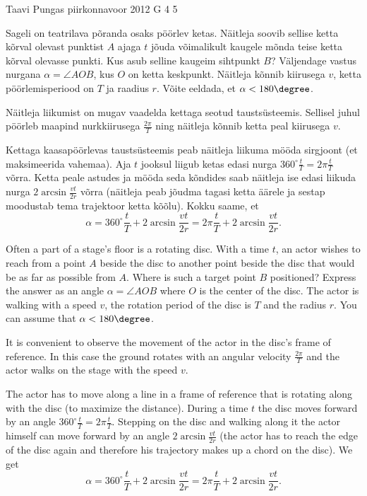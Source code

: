 {Taavi Pungas} %
{piirkonnavoor} %
{2012} %
{G 4} %
{5} %
{
\ifStatement
Sageli on teatrilava põranda osaks pöörlev ketas. Näitleja soovib sellise ketta
kõrval olevast punktist $A$ ajaga $t$ jõuda võimalikult kaugele mõnda teise ketta
kõrval olevasse punkti. Kus asub selline kaugeim sihtpunkt $B$? Väljendage vastus nurgana
$\alpha = \angle \mathit{AOB}$, kus $O$ on ketta keskpunkt. Näitleja kõnnib
kiirusega $v$, ketta pöörlemisperiood on $T$ ja raadius $r$. Võite eeldada, et $\alpha < 180\degree$.
\fi


\ifHint
Näitleja liikumist on mugav vaadelda kettaga seotud taustsüsteemis. Sellisel juhul pöörleb maapind nurkkiirusega $\frac{2\pi}{T}$ ning näitleja kõnnib ketta peal kiirusega $v$.
\fi


\ifSolution
Kettaga kaasapöörlevas taustsüsteemis peab näitleja liikuma mööda sirgjoont (et maksimeerida vahemaa).
Aja $t$ jooksul liigub ketas edasi nurga $360^\circ\frac{t}{T}=2\pi\frac{t}{T}$ võrra. Ketta peale astudes ja mööda seda kõndides saab näitleja ise edasi liikuda nurga $2\arcsin\frac{vt}{2r}$ võrra (näitleja peab jõudma tagasi ketta äärele ja sestap moodustab tema trajektoor ketta kõõlu). Kokku saame, et 
$$\alpha=360^\circ\frac{t}{T}+2\arcsin\frac{vt}{2r}=2\pi\frac{t}{T}+2\arcsin\frac{vt}{2r}.$$
\fi


\ifEngStatement
Often a part of a stage’s floor is a rotating disc. With a time $t$, an actor wishes to reach from a point $A$ beside the disc to another point beside the disc that would be as far as possible from $A$.  Where is such a target point $B$ positioned? Express the answer as an angle $\alpha = \angle \mathit{AOB}$ where $O$ is the center of the disc. The actor is walking with a speed $v$, the rotation period of the disc is $T$ and the radius $r$. You can assume that $\alpha < 180\degree$.
\fi


\ifEngHint
It is convenient to observe the movement of the actor in the disc’s frame of reference. In this case the ground rotates with an angular velocity $\frac{2\pi}{T}$ and the actor walks on the stage with the speed $v$.
\fi


\ifEngSolution
The actor has to move along a line in a frame of reference that is rotating along with the disc (to maximize the distance). During a time $t$ the disc moves forward by an angle $360^\circ\frac{t}{T}=2\pi\frac{t}{T}$. Stepping on the disc and walking along it the actor himself can move forward by an angle $2\arcsin\frac{vt}{2r}$ (the actor has to reach the edge of the disc again and therefore his trajectory makes up a chord on the disc). We get
$$\alpha=360^\circ\frac{t}{T}+2\arcsin\frac{vt}{2r}=2\pi\frac{t}{T}+2\arcsin\frac{vt}{2r}.$$
\fi
}